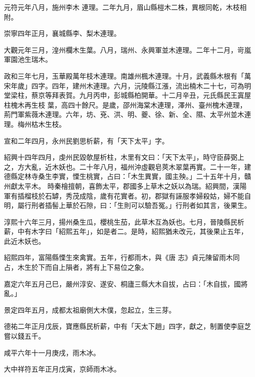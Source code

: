 \begin{pinyinscope}
 元符元年八月，施州李木
 連理。二年九月，眉山縣榿木二株，異根同乾，木枝相附。



 崇寧四年正月，襄城縣李、梨木連理。



 大觀元年三月，湟州欄木生葉。八月，瑞州、永興軍並木連理。二年十二月，岢嵐軍園池生瑞木。



 政和三年七月，玉華殿萬年枝木連理。南雄州楓木連理。十月，武義縣木根有「萬宋年歲」四字。四年，建州木連理。六月，沅陵縣江漲，流出楠木二十七，可為明堂梁柱，蔡京等拜表賀。九月丙申，彭城縣柏開華。十二月辛丑，元氏縣民王寘屋柱槐木再生枝
 葉，高四十餘尺。是歲，邵州海棠木連理，澤州、臺州槐木連理，荊門軍紫薇木連理。六年，坊、兗、洪、明、夔、徐、新、全、隰、太平州並木連理。梅州枯木生枝。



 宣和二年四月，永州民劉思析薪，有「天下太平」字。



 紹興十四年四月，虔州民毀欹屋析柱，木里有文曰：「天下太平」，時守臣薛弼上之，方大亂，近木妖也。二十年八月，福州沖虛觀皂莢木翠葉再實。二十一年，建德縣定林寺桑生李實，慄生桃實，占曰：「木生異實，國主殃。」二十五年十月，贛州獻太平木。
 時秦檜擅朝，喜飾太平，郡國多上草木之妖以為瑞。紹興間，漢陽軍有插榴枝於石罅，秀茂成陰，歲有花實者。初，郡獄有誣服孝婦殺姑，婦不能自明，屬行刑者插髻上華於石隙，曰：「生則可以驗吾冤。」行刑者如其言，後果生。



 淳熙十六年三月，揚州桑生瓜，櫻桃生茄，此草木互為妖也。七月，晉陵縣民析薪，中有木字曰「紹熙五年」，如是者二。是時，紹熙猶未改元，其後果止五年，此近木妖也。



 紹熙四年，富陽縣慄生來禽實。五年，行都雨木，與《唐
 志》貞元陳留雨木同占，木生於下而自上隕者，將有上下易位之象。



 嘉定六年五月己巳，嚴州淳安、遂安、桐廬三縣大木自拔，占曰：「木自拔，國將亂。」



 景定四年五月，成都太祖廟側大木僕，忽起立，生三芽。



 德祐二年正月戊辰，寶應縣民析薪，中有「天太下趙」四字，獻之，制置使李庭芝嘗以錢五千。



 咸平六年十一月庚戌，雨木冰。



 大中祥符五年正月戊寅，京師雨木冰。




\end{pinyinscope}
